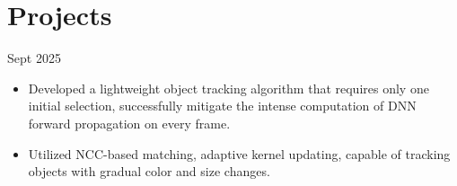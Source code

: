 \documentclass[a4paper,11pt]{article}
\newcommand{\MYhref}[3][black]{\href{#2}{\color{#1}{#3}}}%
\begin{document}





\section{Projects}

\textbf{\MYhref{https://github.com/Marcobisky/YOPO}{YOPO: You Only Pick Once -- Light Object Tracking Algorithm}} \hfill Sept 2025

\begin{itemize}
    \setlength\itemsep{-0.5em}
    \item Developed a lightweight object tracking algorithm that requires only one initial selection, successfully mitigate the intense computation of DNN forward propagation on every frame.
    \item Utilized NCC-based matching, adaptive kernel updating, capable of tracking objects with gradual color and size changes.
\end{itemize}
\end{document}
